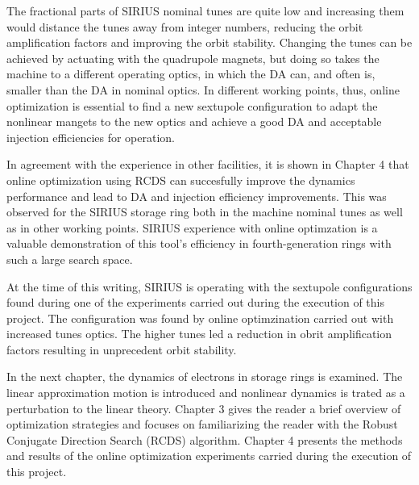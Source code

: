 The fractional parts of SIRIUS nominal tunes are quite low and increasing them would distance the tunes away from integer numbers, reducing the orbit amplification factors and improving the orbit stability. Changing the tunes can be achieved by actuating with the quadrupole magnets, but doing so takes the machine to a different operating optics, in which the DA can, and often is, smaller than the DA in nominal optics. In different working points, thus, online optimization is essential to find a new sextupole configuration to adapt the nonlinear mangets to the new optics and  achieve a good DA and acceptable injection efficiencies for operation.

In agreement with the experience in other facilities, it is shown in Chapter 4 that online optimization using RCDS can succesfully improve the dynamics performance and lead to DA and injection efficiency improvements. This was observed for the SIRIUS storage ring both in the machine nominal tunes as well as in other working points.  SIRIUS experience with online optimzation is a valuable demonstration of this tool's efficiency in fourth-generation rings with such a large search space.

At the time of this writing, SIRIUS is operating with the sextupole configurations found during one of the experiments carried out during the execution of this project. The configuration was found by online optimzination carried out with increased tunes optics. The higher tunes led a reduction in obrit amplification factors resulting in unprecedent orbit stability.

In the next chapter, the dynamics of electrons in storage rings is examined. The linear approximation motion is introduced and nonlinear dynamics is trated as a perturbation to the linear theory. Chapter 3 gives the reader a brief overview of optimization strategies and focuses on familiarizing the reader with the Robust Conjugate Direction Search (RCDS) algorithm. Chapter 4 presents the methods and results of the online optimization experiments carried during the execution of this project.
